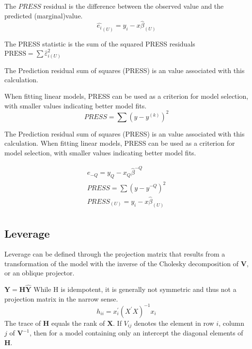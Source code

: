 \documentclass[12pt, a4paper]{report}
\theoremstyle{plain}
\theoremstyle{definition}
\theoremstyle{remark}
\begin{document}
The $PRESS$ residual is the difference between the observed value and the predicted (marginal)value.
\begin{equation}
\hat{e_{i}}_{(U)} = y_{i} - x\hat{\beta}_{(U)}
\end{equation}











%

The PRESS statistic is the sum of the squared PRESS residuals
$\mbox{PRESS} = \sum \hat{\varepsilon}^2_{i(U)}$



The Prediction residual sum of squares (PRESS) is an value associated with this calculation.

When fitting linear models, PRESS can be used as a criterion for model selection, with smaller values indicating better model fits.
\begin{equation}
PRESS = \sum(y-y^{(k)})^2
\end{equation}

The Prediction residual sum of squares (PRESS) is an value associated with this calculation. When fitting linear models, PRESS can be used as a criterion for model selection, with smaller values indicating better model fits.

\begin{eqnarray*}
	e_{-Q} = y_{Q} - x_{Q}\hat{\beta}^{-Q}\\
	PRESS = \sum(y-y^{-Q})^2\\
	PRESS_{(U)} = y_{i} - x\hat{\beta}_{(U)}\\
\end{eqnarray*}
\subsection{Leverage}

Leverage can be defined through the projection matrix that results from a transformation of the model with the inverse of the Cholesky decomposition of $\boldsymbol{V}$, or an oblique projector.

$\boldsymbol{Y} = \boldsymbol{H}\boldsymbol{\hat{Y}}$
While H is idempotent, it is generally not symmetric and thus not a projection matrix in the narrow sense.
\[ h_{ii} = x^{\prime}_{i}(X^{\prime}X)^{-1}x_{i} \]
The trace of $\boldsymbol{H}$ equals the rank of $\boldsymbol{X}$.
If $V_{ij}$ denotes the element in row $i$, column $j$ of $\boldsymbol{V}^{-1}$, then for a model containing only an intercept the diagonal elements of $\boldsymbol{H}$.
\end{document}
